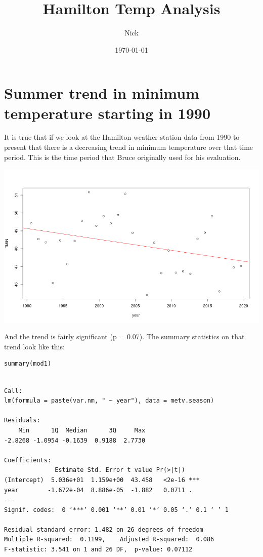 \documentclass[11pt]{article}
\author{Nick}
\date{\today}
\title{Hamilton Temp Analysis}
\begin{document}
\maketitle
\tableofcontents


\section{Summer trend in minimum temperature starting in 1990}
\label{sec:orgcf966ed}

It is true that if we look at the Hamilton weather station data from 1990 to
present that there is a decreasing trend in minimum temperature over that time
period. This is the time period that Bruce originally used for his evaluation.

\begin{center}
\includegraphics[width=.9\linewidth]{summer_tmin_1990.png}
\end{center}

And the trend is fairly significant (p = 0.07). The summary statistics on that
trend look like this:

\begin{verbatim}
summary(mod1)
\end{verbatim}

\begin{verbatim}

Call:
lm(formula = paste(var.nm, " ~ year"), data = metv.season)

Residuals:
    Min      1Q  Median      3Q     Max 
-2.8268 -1.0954 -0.1639  0.9188  2.7730 

Coefficients:
              Estimate Std. Error t value Pr(>|t|)    
(Intercept)  5.036e+01  1.159e+00  43.458   <2e-16 ***
year        -1.672e-04  8.886e-05  -1.882   0.0711 .  
---
Signif. codes:  0 ‘***’ 0.001 ‘**’ 0.01 ‘*’ 0.05 ‘.’ 0.1 ‘ ’ 1

Residual standard error: 1.482 on 26 degrees of freedom
Multiple R-squared:  0.1199,	Adjusted R-squared:  0.086 
F-statistic: 3.541 on 1 and 26 DF,  p-value: 0.07112
\end{verbatim}
\end{document}
